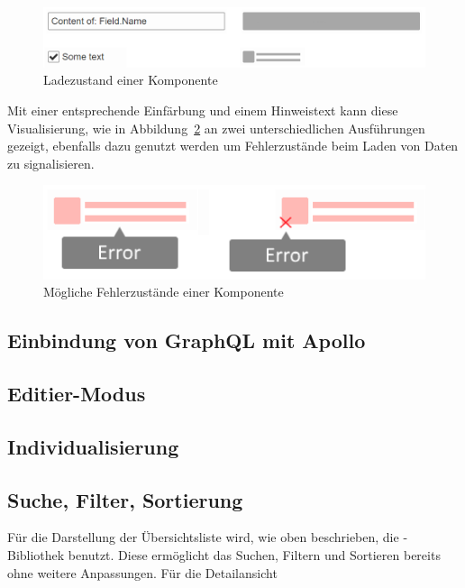\begin{figure}
    \centering
    \captionsetup{justification=centering}
    \includegraphics[width=\textwidth]{figures/comp_loading_final_comparison.png}
        \caption{Ladezustand einer Komponente}\label{fig:comp_loading_final_comparison}
\end{figure}

Mit einer entsprechende Einfärbung und einem Hinweistext kann diese Visualisierung, wie in Abbildung~\ref{fig:comp_possible_error_state} an zwei unterschiedlichen Ausführungen gezeigt, ebenfalls dazu genutzt werden um Fehlerzustände beim Laden von Daten zu signalisieren.

\begin{figure}
    \centering
    \captionsetup{justification=centering}
    \includegraphics[width=\textwidth]{figures/comp_possible_error_state.png}
        \caption{Mögliche Fehlerzustände einer Komponente}\label{fig:comp_possible_error_state}
\end{figure}

\subsection{Einbindung von GraphQL mit Apollo}

\subsection{Editier-Modus}

\subsection{Individualisierung}

\subsection{Suche, Filter, Sortierung}
Für die Darstellung der Übersichtsliste wird, wie oben beschrieben, die -Bibliothek  benutzt. Diese ermöglicht das Suchen, Filtern und Sortieren bereits ohne weitere Anpassungen. Für die Detailansicht 

